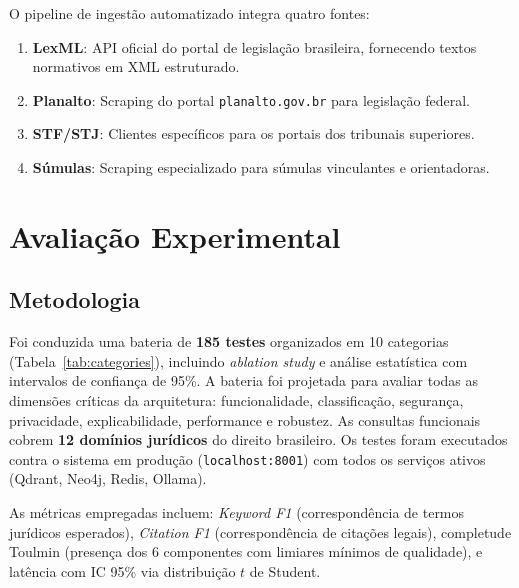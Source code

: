 \documentclass[journal,10pt]{IEEEtran}
\begin{document}
O pipeline de ingest\~{a}o automatizado integra quatro fontes:

\begin{enumerate}    \item \textbf{LexML}: API oficial do portal de legisla\c{c}\~{a}o brasileira, fornecendo textos normativos em XML estruturado.
    \item \textbf{Planalto}: Scraping do portal \texttt{planalto.gov.br} para legisla\c{c}\~{a}o federal.
    \item \textbf{STF/STJ}: Clientes espec\'{i}ficos para os portais dos tribunais superiores.
    \item \textbf{S\'{u}mulas}: Scraping especializado para s\'{u}mulas vinculantes e orientadoras.
\end{enumerate}

\section{Avalia\c{c}\~{a}o Experimental}

\subsection{Metodologia}

Foi conduzida uma bateria de \textbf{185 testes} organizados em 10 categorias (Tabela~\ref{tab:categories}), incluindo \textit{ablation study} e an\'{a}lise estat\'{i}stica com intervalos de confian\c{c}a de 95\%. A bateria foi projetada para avaliar todas as dimens\~{o}es cr\'{i}ticas da arquitetura: funcionalidade, classifica\c{c}\~{a}o, seguran\c{c}a, privacidade, explicabilidade, performance e robustez. As consultas funcionais cobrem \textbf{12 dom\'{i}nios jur\'{i}dicos} do direito brasileiro. Os testes foram executados contra o sistema em produ\c{c}\~{a}o (\texttt{localhost:8001}) com todos os servi\c{c}os ativos (Qdrant, Neo4j, Redis, Ollama).

As m\'{e}tricas empregadas incluem: \textit{Keyword F1} (correspond\^{e}ncia de termos jur\'{i}dicos esperados), \textit{Citation F1} (correspond\^{e}ncia de cita\c{c}\~{o}es legais), completude Toulmin (presen\c{c}a dos 6 componentes com limiares m\'{i}nimos de qualidade), e lat\^{e}ncia com IC 95\% via distribui\c{c}\~{a}o $t$ de Student.
\end{document}
